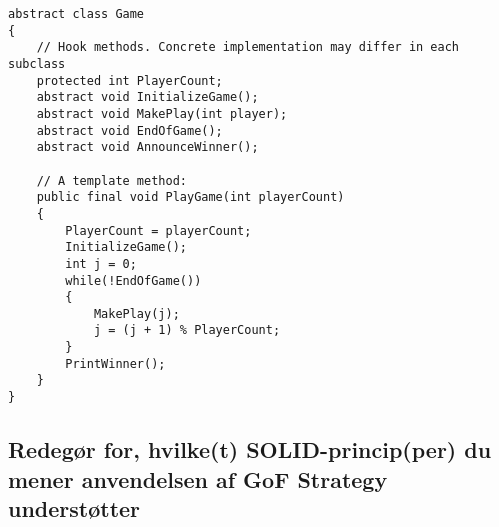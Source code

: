 \begin{lstlisting}
abstract class Game 
{
	// Hook methods. Concrete implementation may differ in each subclass
	protected int PlayerCount;
	abstract void InitializeGame();
	abstract void MakePlay(int player);
	abstract void EndOfGame();
	abstract void AnnounceWinner();
	
	// A template method:
	public final void PlayGame(int playerCount)
	{
		PlayerCount = playerCount;
		InitializeGame();
		int j = 0;
		while(!EndOfGame())
		{
			MakePlay(j);
			j = (j + 1) % PlayerCount;
		}
		PrintWinner();
	}
}
\end{lstlisting}

\subsection{Redegør for, hvilke(t) SOLID-princip(per) du mener anvendelsen af GoF Strategy understøtter}








